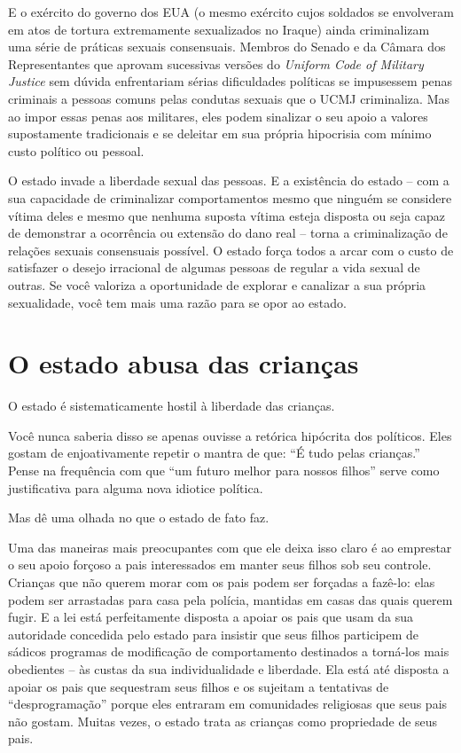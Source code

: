 E o exército do governo dos EUA (o mesmo exército cujos soldados se envolveram em atos de tortura extremamente sexualizados no Iraque) ainda criminalizam uma série de práticas sexuais consensuais. Membros do Senado e da Câmara dos Representantes que aprovam sucessivas versões do \emph{Uniform Code of Military Justice} sem dúvida enfrentariam sérias dificuldades políticas se impusessem penas criminais a pessoas comuns pelas condutas sexuais que o UCMJ criminaliza. Mas ao impor essas penas aos militares, eles podem sinalizar o seu apoio a valores supostamente tradicionais e se deleitar em sua própria hipocrisia com mínimo custo político ou pessoal.

O estado invade a liberdade sexual das pessoas. E a existência do estado -- com a sua capacidade de criminalizar comportamentos mesmo que ninguém se considere vítima deles e mesmo que nenhuma suposta vítima esteja disposta ou seja capaz de demonstrar a ocorrência ou extensão do dano real -- torna a criminalização de relações sexuais consensuais possível. O estado força todos a arcar com o custo de satisfazer o desejo irracional de algumas pessoas de regular a vida sexual de outras. Se você valoriza a oportunidade de explorar e canalizar a sua própria sexualidade, você tem mais uma razão para se opor ao estado.

\section{O estado abusa das crianças}

O estado é sistematicamente hostil à liberdade das crianças.

Você nunca saberia disso se apenas ouvisse a retórica hipócrita dos políticos. Eles gostam de enjoativamente repetir o mantra de que: ``É tudo pelas crianças.'' Pense na frequência com que ``um futuro melhor para nossos filhos'' serve como justificativa para alguma nova idiotice política.

Mas dê uma olhada no que o estado de fato faz.

Uma das maneiras mais preocupantes com que ele deixa isso claro é ao emprestar o seu apoio forçoso a pais interessados em manter seus filhos sob seu controle. Crianças que não querem morar com os pais podem ser forçadas a fazê-lo: elas podem ser arrastadas para casa pela polícia, mantidas em casas das quais querem fugir. E a lei está perfeitamente disposta a apoiar os pais que usam da sua autoridade concedida pelo estado para insistir que seus filhos participem de sádicos programas de modificação de comportamento destinados a torná-los mais obedientes -- às custas da sua individualidade e liberdade. Ela está até disposta a apoiar os pais que sequestram seus filhos e os sujeitam a tentativas de ``desprogramação'' porque eles entraram em comunidades religiosas que seus pais não gostam. Muitas vezes, o estado trata as crianças como propriedade de seus pais.

